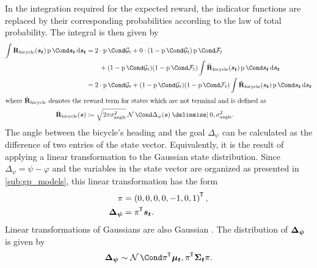 In the integration required for the expected reward, the indicator functions are replaced by their corresponding probabilities according to the law of total probability.
The integral is then given by
\begin{align}
    \int \RwdBicycle(\rv{s_t}) \Prob{\rv{s_t}} \diff \rv{s_t} &= 2 \cdot \Prob{\PGoal_t} + 0 \cdot (1 - \Prob{\PGoal_t}) \Prob{\PFallen_t} \\
    &\qquad + (1 - \Prob{\PGoal_t})(1 - \Prob{\PFallen_t}) \int \RwdBicycleHat(\rv{s_t}) \Prob{\rv{s_t}} \diff \rv{s_t} \\
    &= 2 \cdot \Prob{\PGoal_t} + (1 - \Prob{\PGoal_t})(1 - \Prob{\PFallen_t}) \int \RwdBicycleHat(\rv{s_t}) \Prob{\rv{s_t}} \diff \rv{s_t} \\
    \intertext{where $\RwdBicycleHat$ denotes the reward term for states which are not terminal and is defined as}
    \RwdBicycleHat(\rv{s}) &\coloneqq \sqrt{2\pi\sigma_{\text{angle}}^2} \Gaussian{\Delta_\psi(\rv{s}) \given 0, \sigma_{\text{angle}}^2}.
\end{align}
The angle between the bicycle's heading and the goal $\Delta_\psi$ can be calculated as the difference of two entries of the state vector.
Equivalently, it is the result of applying a linear transformation to the Gaussian state distribution.
Since $\Delta_\psi = \psi - \varphi$ and the variables in the state vector are organized as presented in \cref{sub:gp_models}, this linear transformation has the form
\begin{align}
    \pi &= \left( 0, 0, 0, 0, -1, 0, 1 \right)\tran, \\
    \rv{\Delta_\psi} &= \pi\tran \rv{s_t}.
\end{align}
Linear transformations of Gaussians are also Gaussian \cite{petersen_matrix_2008}.
The distribution of $\bm{\Delta_\psi}$ is given by
\begin{align}
    \rv{\Delta_\psi} \sim \Gaussian{\pi\tran\mat{\mu_t}, \pi\tran \mat{\Sigma_t} \pi}.
\end{align}

